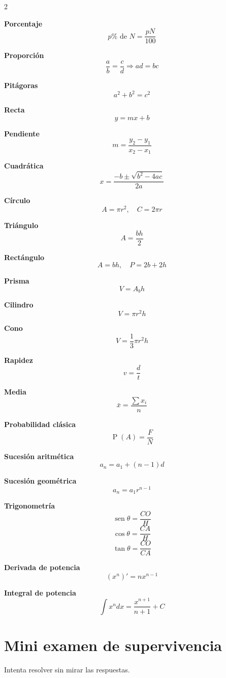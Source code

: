 \documentclass[10pt,oneside]{book}
\newcommand{\sen}{\operatorname{sen}}
\newcommand{\Prob}{\operatorname{P}}
\begin{document}
	\small
	\begin{multicols}{2}
		
		\textbf{Porcentaje}
		\[
		p\%\text{ de }N=\frac{pN}{100}
		\]
		
		\textbf{Proporción}
		\[
		\frac ab=\frac cd\Rightarrow ad=bc
		\]
		
		\textbf{Pitágoras}
		\[
		a^2+b^2=c^2
		\]
		
		\textbf{Recta}
		\[
		y=mx+b
		\]
		
		\textbf{Pendiente}
		\[
		m=\frac{y_2-y_1}{x_2-x_1}
		\]
		
		\textbf{Cuadrática}
		\[
		x=\frac{-b\pm\sqrt{b^2-4ac}}{2a}
		\]
		
		\textbf{Círculo}
		\[
		A=\pi r^2,\quad C=2\pi r
		\]
		
		\textbf{Triángulo}
		\[
		A=\frac{bh}{2}
		\]
		
		\textbf{Rectángulo}
		\[
		A=bh,\quad P=2b+2h
		\]
		
		\textbf{Prisma}
		\[
		V=A_bh
		\]
		
		\textbf{Cilindro}
		\[
		V=\pi r^2h
		\]
		
		\textbf{Cono}
		\[
		V=\frac13\pi r^2h
		\]
		
		\textbf{Rapidez}
		\[
		v=\frac dt
		\]
		
		\textbf{Media}
		\[
		\bar{x}=\frac{\sum x_i}{n}
		\]
		
		\textbf{Probabilidad clásica}
		\[
		\Prob(A)=\frac{F}{N}
		\]
		
		\textbf{Sucesión aritmética}
		\[
		a_n=a_1+(n-1)d
		\]
		
		\textbf{Sucesión geométrica}
		\[
		a_n=a_1r^{n-1}
		\]
		
		\textbf{Trigonometría}
		\[
		\sen\theta=\frac{CO}{H}
		\]
		\[
		\cos\theta=\frac{CA}{H}
		\]
		\[
		\tan\theta=\frac{CO}{CA}
		\]
		
		\textbf{Derivada de potencia}
		\[
		(x^n)'=nx^{n-1}
		\]
		
		\textbf{Integral de potencia}
		\[
		\int x^n dx=\frac{x^{n+1}}{n+1}+C
		\]
		
	\end{multicols}
	\normalsize
	
	\chapter{Mini examen de supervivencia}
	
	Intenta resolver sin mirar las respuestas.
	
\end{document}

